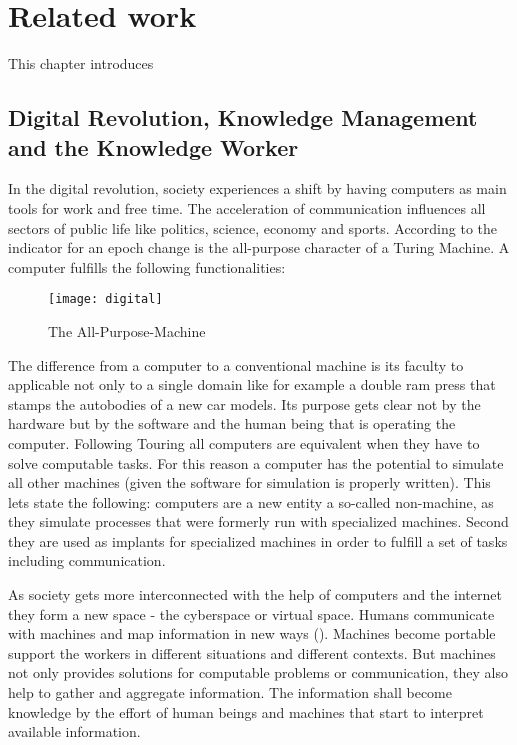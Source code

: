 
\chapter{Related work}
\label{relatedwork}
This chapter introduces

\section{Digital Revolution, Knowledge Management and the Knowledge Worker}
\label{knowledgemanagement}
In the digital revolution, society experiences a shift by having computers as main tools for work and free time. The acceleration of communication influences all sectors of public life like politics, science, economy and sports. According to \cite{buhl1997virtuelle} the indicator for an epoch change is the all-purpose character of a Turing Machine. A computer fulfills the following functionalities:

\begin{figure}[ht]
	\centering
  \texttt{[image: digital]}
	\caption{The All-Purpose-Machine}
	\label{fig1}
\end{figure}

The difference from a computer to a conventional machine is its faculty to applicable not only to a single domain like for example a double ram press that stamps the autobodies of a new car models. Its purpose gets clear not by the hardware but by the software and the human being that is operating the computer. Following Touring all computers are equivalent when they have to solve computable tasks. For this reason a computer has the potential to simulate all other machines (given the software for simulation is properly written). This lets \cite{buhl1997virtuelle} state the following: computers are a new entity a so-called non-machine, as they simulate processes that were formerly run with specialized machines. Second they are used as implants for specialized machines in order to fulfill a set of tasks including communication. 

As society gets more interconnected with the help of computers and the internet they form a new space - the cyberspace or virtual space. Humans communicate with machines and map information in new ways (\cite{dodge2001atlas}). Machines become portable support the workers in different situations and different contexts. But machines not only provides solutions for computable problems or communication, they also help to gather and aggregate information. The information shall become knowledge by the effort of human beings and machines that start to interpret available information. 

